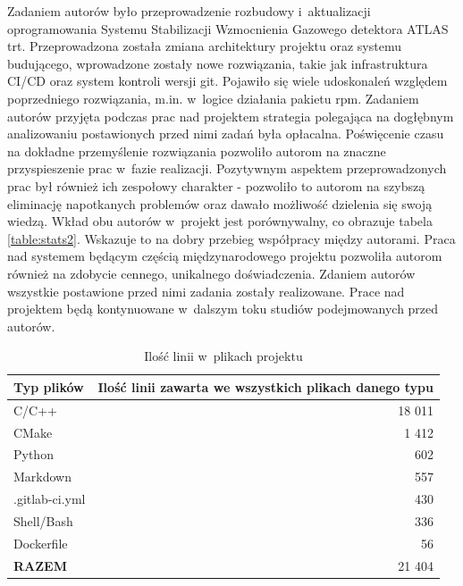 Zadaniem autorów było przeprowadzenie rozbudowy i~aktualizacji oprogramowania Systemu Stabilizacji Wzmocnienia Gazowego detektora ATLAS \gls*{trt}. Przeprowadzona została zmiana architektury projektu oraz systemu budującego, wprowadzone zostały nowe rozwiązania, takie jak infrastruktura CI/CD oraz system kontroli wersji \gls*{git}. Pojawiło się wiele udoskonaleń względem poprzedniego rozwiązania, m.in. w~logice działania pakietu \gls*{rpm}.
Zadaniem autorów przyjęta podczas prac nad projektem strategia polegająca na dogłębnym analizowaniu postawionych przed nimi zadań była opłacalna. Poświęcenie czasu na dokładne przemyślenie rozwiązania pozwoliło autorom na znaczne przyspieszenie prac w~fazie realizacji. Pozytywnym aspektem przeprowadzonych prac był również ich zespołowy charakter - pozwoliło to autorom na szybszą eliminację napotkanych problemów oraz dawało możliwość dzielenia się swoją wiedzą. Wkład obu autorów w~projekt jest porównywalny, co obrazuje tabela \ref{table:stats2}. Wskazuje to na dobry przebieg współpracy między autorami. Praca nad systemem będącym częścią międzynarodowego projektu pozwoliła autorom również na zdobycie cennego, unikalnego doświadczenia.
Zdaniem autorów wszystkie postawione przed nimi zadania zostały realizowane. Prace nad projektem będą kontynuowane w~dalszym toku studiów podejmowanych przed autorów.


\begin{table}[htbp]
\centering
\caption{Ilość linii w~plikach projektu}
\label{table:stats1}
\begin{tabular}{@{}lr@{}}
\toprule
Typ plików & 
Ilość linii zawarta we wszystkich plikach danego typu \\

\midrule

C/C++               & 18 011 \\
CMake               & 1 412 \\
Python              & 602 \\
Markdown            & 557 \\
.gitlab-ci.yml      & 430 \\
Shell/Bash          & 336 \\
Dockerfile          & 56 \\
\textbf{RAZEM}      & 21 404 \\

\bottomrule
\end{tabular}
\end{table}


